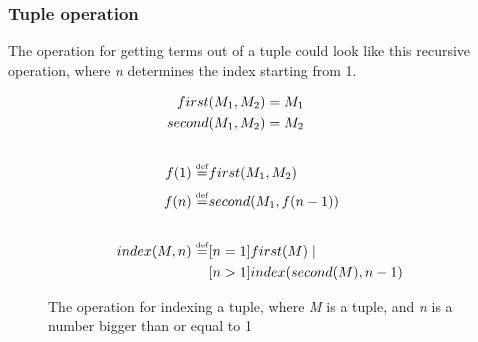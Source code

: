 \subsubsection{Tuple operation}
The operation for getting terms out of a tuple could look like this recursive operation, where \textit{n} determines the index starting from 1.
\begin{figure}[h]
    \begin{center}
        \begin{align*}
            first&(M_1, M_2) = M_1\\
            second&(M_1, M_2) = M_2\\
            \\
            f(1) \overset{\underset{\mathrm{def}}{}}{=} & first(M_1, M_2)\\
            f(n) \overset{\underset{\mathrm{def}}{}}{=} & second(M_1, f(n-1))\\
            \\
            index(M, n) \overset{\underset{\mathrm{def}}{}}{=} &[n = 1]first(M)\mid \\
            &[n > 1]index(second(M), n-1)
        \end{align*}
    \end{center}
    \caption{The operation for indexing a tuple, where \textit{M} is a tuple, and \textit{n} is a number bigger than  or equal to 1}
\end{figure}
\FloatBarrier
